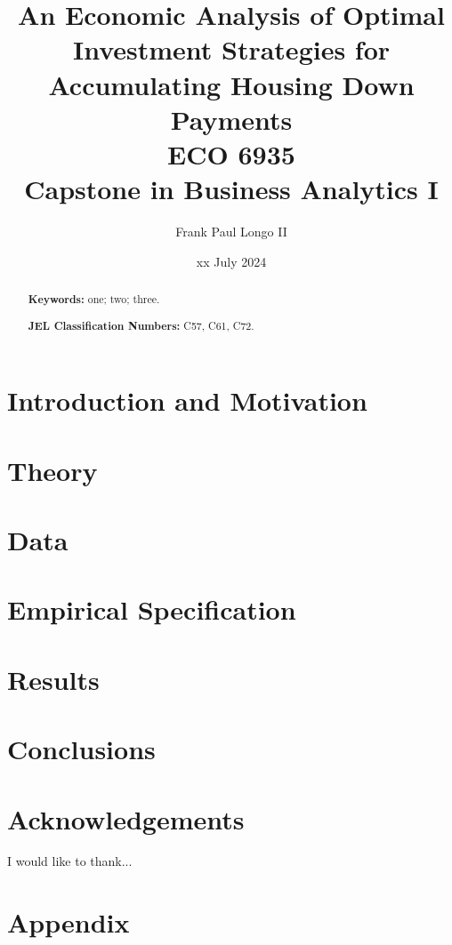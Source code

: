 \documentclass[10pt]{article}
\title{An Economic Analysis of Optimal Investment Strategies for Accumulating Housing Down Payments\\
       {\large ECO 6935}\\
       {\large Capstone in Business Analytics I}}
\author{Frank Paul Longo II}
\date{xx July 2024}
\begin{document}
\maketitle

\begin{abstract}


\bigskip
\bigskip

\noindent
\textbf{Keywords:} one; two; three.

\bigskip

\noindent
\textbf{JEL Classification Numbers:} C57, C61, C72.
\end{abstract}

\vfill
\eject

\section{Introduction and Motivation}


\section{Theory}


\section{Data}


\section{Empirical Specification}


\section{Results}


\section{Conclusions}


\section*{Acknowledgements}
I would like to thank...

\section*{Appendix}




\end{document}
